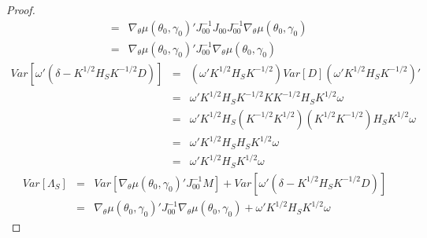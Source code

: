 \documentclass[12pt]{article}
\theoremstyle{definition}
\begin{document}
\begin{proof}
\begin{eqnarray*}
		&=& \nabla_{\theta}\mu(\theta_0,\gamma_0)'J_{00}^{-1}J_{00}J_{00}^{-1}\nabla_{\theta}\mu(\theta_0,\gamma_0)\\
		&=& \nabla_{\theta}\mu(\theta_0,\gamma_0)'J_{00}^{-1}\nabla_{\theta}\mu(\theta_0,\gamma_0)
	\end{eqnarray*}
	\begin{eqnarray*}
		Var\left[\omega'\left(\delta -K^{1/2}H_S K^{-1/2}D\right)\right]&=&\left( \omega'K^{1/2}H_S K^{-1/2}\right)Var[D]\left( \omega'K^{1/2}H_S K^{-1/2}\right)'\\
				&=&\omega'K^{1/2}H_S K^{-1/2}K K^{-1/2}H_SK^{1/2}\omega\\
				&=&\omega'K^{1/2}H_S \left(K^{-1/2}K^{1/2}\right)\left(K^{1/2} K^{-1/2}\right)H_SK^{1/2}\omega\\
				&=&\omega'K^{1/2}H_S H_SK^{1/2}\omega\\
				&=&\omega'K^{1/2}H_S K^{1/2}\omega
	\end{eqnarray*}
	\begin{eqnarray*}
		Var[\Lambda_S] &=& Var\left[\nabla_{\theta}\mu(\theta_0, \gamma_0)'J_{00}^{-1}M\right] + Var\left[\omega'\left(\delta -K^{1/2}H_S K^{-1/2}D\right)\right]\\
					&=& \nabla_{\theta}\mu(\theta_0,\gamma_0)'J_{00}^{-1}\nabla_{\theta}\mu(\theta_0,\gamma_0) + \omega'K^{1/2}H_S K^{1/2}\omega
	\end{eqnarray*}
\end{proof}
\end{document}
